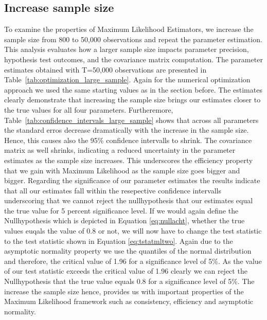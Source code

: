 \documentclass[11pt]{article}
\begin{document}
\subsection{Increase sample size}
To examine the properties of Maximum Likelihood Estimators, we increase the sample size from 800 to 50,000 observations and repeat the parameter estimation. This analysis evaluates how a larger sample size impacts parameter precision, hypothesis test outcomes, and the covariance matrix computation.
The parameter estimates obtained with T=50,000 observations are presented in Table~\ref{tab:optimization_large_sample}. Again for the  numerical optimization approach we used the same starting values as in the section before.
The estimates clearly demonstrate that increasing the sample size brings our estimates closer to the true values for all four parameters.
Furtheremore, Table~\ref{tab:confidence_intervals_large_sample} shows that across all parameters the standard erros decrease dramatically with the increase in the sample size.
Hence, this causes also the 95\% confidence intervalls to shrink.
The covariance matrix as well shrinks, indicating a reduced uncertainty in the parameter estimates as the sample size increases.
This underscores the efficiency property that we gain with Maximum Likelihood as the sample size goes bigger and bigger.
Regarding the significance of our parameter estimates the results indicate that all our estimates fall within the resepective confidence intervalls underscoring that we cannot reject the nullhypothesis that our estimates equal the true value for 5 percent significance level.
If we would again define the Nullhypothesis which is depicted in Equation  \ref{eq:nullacht}, whether the true values euqals the value of 0.8 or not, we will now have to change the test statistic to the test statistic shown in Equation \ref{eq:tstatmltwo}.
Again due to the asymptotic normality property we use the quantiles of the normal distribution and therefore, the critical value of 1.96 for a significance level of 5\%.
As the value of our test statistic exceeds the critical value of 1.96 clearly we can reject the Nullhypothesis that the true value equals 0.8 for a significance level of 5\%.
The increase the sample size hence, provides us with important properties of the Maximum Likelihood framework such as consistency, efficiency and asymptotic normality.
\end{document}
